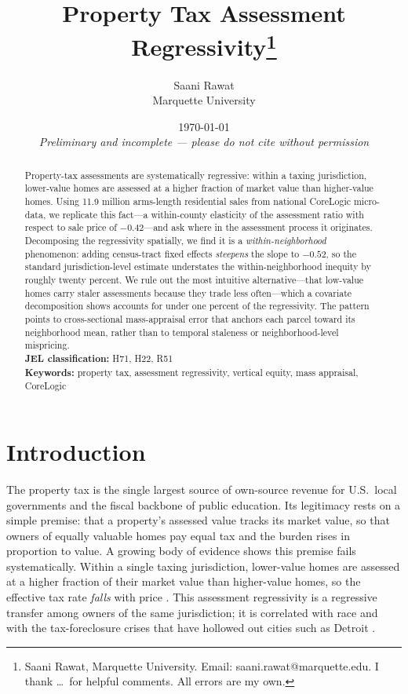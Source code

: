 \documentclass[12pt, letterpaper]{article}
\title{Property Tax Assessment Regressivity\thanks{Saani Rawat, Marquette University. Email: saani.rawat@marquette.edu. I thank \dots\ for helpful comments. All errors are my own.}}
\author{Saani Rawat\\Marquette University}
\date{\today\\\textit{Preliminary and incomplete --- please do not cite without permission}}
\begin{document}
\maketitle

\begin{abstract}
\noindent Property-tax assessments are systematically regressive: within a taxing jurisdiction, lower-value homes are assessed at a higher fraction of market value than higher-value homes. Using 11.9 million arms-length residential sales from national CoreLogic micro-data, we replicate this fact---a within-county elasticity of the assessment ratio with respect to sale price of $-0.42$---and ask where in the assessment process it originates. Decomposing the regressivity spatially, we find it is a \emph{within-neighborhood} phenomenon: adding census-tract fixed effects \emph{steepens} the slope to $-0.52$, so the standard jurisdiction-level estimate understates the within-neighborhood inequity by roughly twenty percent. We rule out the most intuitive alternative---that low-value homes carry staler assessments because they trade less often---which a covariate decomposition shows accounts for under one percent of the regressivity. The pattern points to cross-sectional mass-appraisal error that anchors each parcel toward its neighborhood mean, rather than to temporal staleness or neighborhood-level mispricing. \\[4pt]
\textbf{JEL classification:} H71, H22, R51 \\
\textbf{Keywords:} property tax, assessment regressivity, vertical equity, mass appraisal, CoreLogic
\end{abstract}

\section{Introduction}\label{sec:intro}

The property tax is the single largest source of own-source revenue for U.S.\ local governments and the fiscal backbone of public education. Its legitimacy rests on a simple premise: that a property's assessed value tracks its market value, so that owners of equally valuable homes pay equal tax and the burden rises in proportion to value. A growing body of evidence shows this premise fails systematically. Within a single taxing jurisdiction, lower-value homes are assessed at a higher fraction of their market value than higher-value homes, so the effective tax rate \emph{falls} with price \citep{berry2021reassessing, mcmillen2020assessment}. This assessment regressivity is a regressive transfer among owners of the same jurisdiction; it is correlated with race \citep{avenancioleon2022assessment} and with the tax-foreclosure crises that have hollowed out cities such as Detroit \citep{atuahene2019taxed, hodge2017assessment}.
\end{document}
